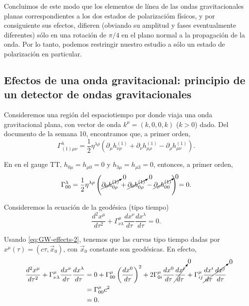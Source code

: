 \documentclass[letterpaper,11pt]{article}
\begin{document}
Concluimos de este modo que los elementos de línea de las ondas gravitacionales planas correspondientes a los dos estados de polarizacióm físicos, y por consiguiente sus efectos, difieren
(obviando su amplitud y fases eventualmente diferentes) sólo en una rotación de $\pi/4$ en el plano normal a la propagación de la onda. Por lo tanto, podemos restringir nuestro estudio a sólo un estado de polarización en particular.

\subsection{Efectos de una onda gravitacional: principio de un detector de ondas gravitacionales}

Consideremos una región del espaciotiempo por donde viaja una onda gravitacional plana, con vector de onda $k^{\mu} = (k,0,0,k)$ ($k > 0$) dado.  Del documento de la semana 10, encontramos que, a primer orden,
\begin{equation}
\Gamma^{\lambda}_{(1)\mu\nu} = \frac{1}{2} \eta^{\lambda\rho} \left(\partial_{\mu} h_{\nu\rho}^{(1)} + \partial_{\nu} h_{\mu\rho}^{(1)} - \partial_{\rho} h_{\mu\nu}^{(1)} \right). \label{eq:GW-effects-1}
\end{equation}

En en el gauge TT, $h_{0\mu} = h_{\mu 0} = 0$ y $h_{3\mu} = h_{\mu 3} = 0$, entonces, a primer orden,
\begin{equation}
\Gamma^{\lambda}_{00} = \frac{1}{2} \eta^{\lambda\rho} \left(\cancelto{0}{\partial_{0} h_{0\rho}^{(1)}} + \cancelto{0}{\partial_{0} h_{0\rho}^{(1)}} - \cancelto{0}{\partial_{\rho} h_{00}^{(1)}} \right) = 0. \label{eq:GW-effects-2}
\end{equation}

Consideremos la ecuación de la geodésica (tipo tiempo)
\begin{equation}
\frac{d^2x^{\mu}}{d\tau^2} + \Gamma^{\mu}_{\nu\lambda} \frac{dx^{\nu}}{d\tau} \frac{dx^{\lambda}}{d\tau} = 0. \label{eq:GW-effects-3}
\end{equation} 

Usando \eqref{eq:GW-effects-2}, tenemos que las curvas tipo tiempo dadas por $x^{\mu}(\tau) = (c\tau,\vec{x}_0)$, con $\vec{x}_0$ constante son geodésicas. En efecto,
\begin{align}
\frac{d^2x^{\mu}}{d\tau^2} + \Gamma^{\mu}_{\nu\lambda} \frac{dx^{\nu}}{d\tau} \frac{dx^{\lambda}}{d\tau} &= 0 + \Gamma^{\mu}_{00} \left(\frac{dx^0}{d\tau}\right)^2 +  2 \Gamma^{\mu}_{0i} \frac{dx^0}{d\tau} \cancelto{0}{\frac{dx^i}{d\tau}} + \Gamma^{\mu}_{ij} \cancelto{0}{\frac{dx^i}{d\tau} \frac{dx^j}{d\tau}} \nonumber\\
&= \Gamma^{\mu}_{00} c^2 \nonumber\\ 
&= 0.
\end{align}
\end{document}
